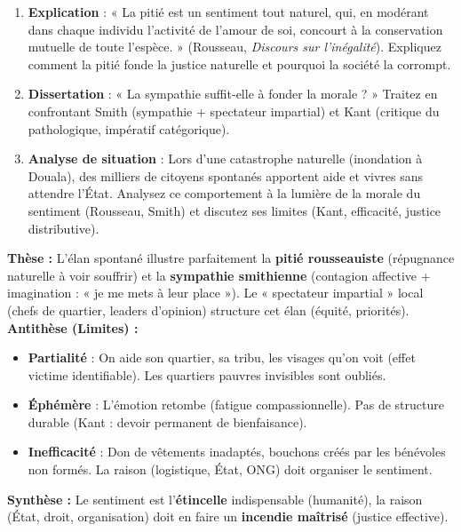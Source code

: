 \documentclass[11pt]{article}
\begin{document}
\begin{exercice}
\begin{enumerate}
    \item \textbf{Explication} : « La pitié est un sentiment tout naturel, qui, en modérant dans chaque individu l'activité de l'amour de soi, concourt à la conservation mutuelle de toute l'espèce. » (Rousseau, \emph{Discours sur l'inégalité}). Expliquez comment la pitié fonde la justice naturelle et pourquoi la société la corrompt.
    \item \textbf{Dissertation} : « La sympathie suffit-elle à fonder la morale ? » Traitez en confrontant Smith (sympathie + spectateur impartial) et Kant (critique du pathologique, impératif catégorique).
    \item \textbf{Analyse de situation} : Lors d'une catastrophe naturelle (inondation à Douala), des milliers de citoyens spontanés apportent aide et vivres sans attendre l'État. Analysez ce comportement à la lumière de la morale du sentiment (Rousseau, Smith) et discutez ses limites (Kant, efficacité, justice distributive).
\end{enumerate}
\end{exercice}

\begin{corrige}
\textbf{Thèse :} L'élan spontané illustre parfaitement la \textbf{pitié rousseauiste} (répugnance naturelle à voir souffrir) et la \textbf{sympathie smithienne} (contagion affective + imagination : « je me mets à leur place »). Le « spectateur impartial » local (chefs de quartier, leaders d'opinion) structure cet élan (équité, priorités).
\textbf{Antithèse (Limites) :} 
\begin{itemize}
    \item \textbf{Partialité} : On aide son quartier, sa tribu, les visages qu'on voit (effet victime identifiable). Les quartiers pauvres invisibles sont oubliés.
    \item \textbf{Éphémère} : L'émotion retombe (fatigue compassionnelle). Pas de structure durable (Kant : devoir permanent de bienfaisance).
    \item \textbf{Inefficacité} : Don de vêtements inadaptés, bouchons créés par les bénévoles non formés. La raison (logistique, État, ONG) doit organiser le sentiment.
\end{itemize}
\textbf{Synthèse :} Le sentiment est l'\textbf{étincelle} indispensable (humanité), la raison (État, droit, organisation) doit en faire un \textbf{incendie maîtrisé} (justice effective).
\end{corrige}
\end{document}
